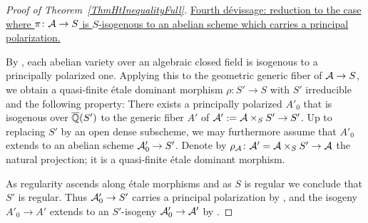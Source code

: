 \begin{proof}[Proof of Theorem~\ref{ThmHtInequalityFull}]
\ul{Fourth d\'{e}vissage: reduction to the case where $\pi \colon \mathcal{A} \rightarrow S$ is $S$-isogenous to an abelian scheme which carries a principal polarization.}


By \cite[$\mathsection$23,
Corollary~1]{MumfordAbVar}, each abelian variety over an algebraic
closed field is isogenous to a principally polarized one. Applying
this to the geometric generic fiber of $\mathcal{A} \rightarrow S$, we obtain a
quasi-finite \'{e}tale dominant morphism 
 $\rho \colon S' \rightarrow S$ with $S'$ irreducible and the
 following property: There exists a principally polarized $A'_0$ that
 is isogenous over ${\overline{\mathbb{Q}}}(S')$ to  the
 generic fiber $A'$ of $\mathcal{A}':= \mathcal{A}\times_{S} S' \rightarrow S'$. 
 Up to replacing $S'$ by an open dense subscheme, we may furthermore assume that $A'_0$ extends to an abelian scheme $\mathcal{A}'_0 \rightarrow S'$. 
 Denote by $\rho_{\mathcal{A}} \colon \mathcal{A}' =\mathcal{A} \times_S S' \rightarrow \mathcal{A}$ the natural projection; it is a quasi-finite \'{e}tale dominant morphism.

As regularity ascends along \'etale morphisms and as $S$ is regular we conclude that $S'$ is regular. Thus $\mathcal{A}'_0 \rightarrow S'$ carries a principal polarization by \cite[Th\'{e}or\`{e}me~XI~1.4]{LNM119}, and the isogeny $A'_0 \rightarrow A'$ extends to an $S'$-isogeny $\mathcal{A}'_0 \rightarrow \mathcal{A}'$ by \cite[Lemme~XI~1.15]{LNM119}.%



\end{proof}
